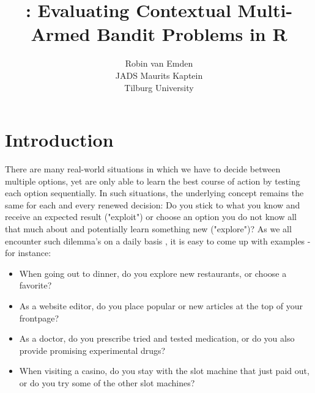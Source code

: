 \documentclass{jss}
\author{Robin van Emden\\JADS \And
  Maurits Kaptein\\Tilburg University}
\title{\pkg{contextual}: Evaluating Contextual Multi-Armed Bandit Problems in R}
\begin{document}
\sloppy



\section{Introduction} \label{intro}

There are many real-world situations in which we have to decide between multiple options, yet are only able to learn the best course of action by testing each option sequentially. In such situations, the underlying concept remains the same for each and every renewed decision: Do you stick to what you know and receive an expected result ("exploit") or choose an option you do not know all that much about and potentially learn something new ("explore")? As we all encounter such dilemma's on a daily basis \citep{Wilson2014}, it is easy to come up with examples - for instance:

\begin{itemize}
\item When going out to dinner, do you explore new restaurants, or choose a favorite?
\item As a website editor, do you place popular or new articles at the top of your frontpage?
\item As a doctor, do you prescribe tried and tested medication, or do you also provide promising experimental drugs?
\item When visiting a casino, do you stay with the slot machine that just paid out, or do you try some of the other slot machines?
\end{itemize}
\end{document}
